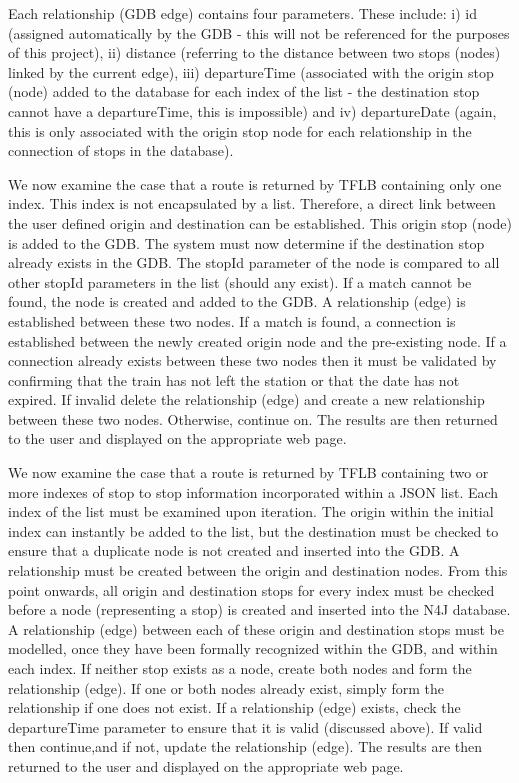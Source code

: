 \documentclass[12pt]{article}   	%
\begin{document}
Each relationship (GDB edge) contains four parameters. These include: i) id (assigned automatically by the GDB - this will not be referenced for the purposes of this project), ii) distance (referring to the distance between two stops (nodes) linked by the current edge), iii) departureTime (associated with the origin stop (node) added to the database for each index of the list - the destination stop cannot have a departureTime, this is impossible) and iv) departureDate (again, this is only associated with the origin stop node for each relationship in the connection of stops in the database).

We now examine the case that a route is returned by TFLB containing only one index. This index is not encapsulated by a list. Therefore, a direct link between the user defined origin and destination can be established. This origin stop (node) is added to the GDB. The system must now determine if the destination stop already exists in the GDB. The stopId parameter of the node is compared to all other stopId parameters in the list (should any exist). If a match cannot be found, the node is created and added to the GDB. A relationship (edge) is established between these two nodes. If a match is found, a connection is established between the newly created origin node and the pre-existing node. If a connection already exists between these two nodes then it must be validated by confirming that the train has not left the station or that the date has not expired. If invalid delete the relationship (edge) and create a new relationship between these two nodes. Otherwise, continue on. The results are then returned to the user and displayed on the appropriate web page.

We now examine the case that a route is returned by TFLB containing two or more indexes of stop to stop information incorporated within a JSON list. Each index of the list must be examined upon iteration. The origin within the initial index can instantly be added to the list, but the destination must be checked to ensure that a duplicate node is not created and inserted into the GDB. A relationship must be created between the origin and destination nodes. From this point onwards, all origin and destination stops for every index must be checked before a node (representing a stop) is created and inserted into the N4J database. A relationship (edge) between each of these origin and destination stops must be modelled, once they have been formally recognized within the GDB, and within each index. If neither stop exists as a node, create both nodes and form the relationship (edge). If one or both nodes already exist, simply form the relationship if one does not exist. If a relationship (edge) exists, check the departureTime parameter to ensure that it is valid (discussed above). If valid then continue,and  if not, update the relationship (edge). The results are then returned to the user and displayed on the appropriate web page.
\end{document}
